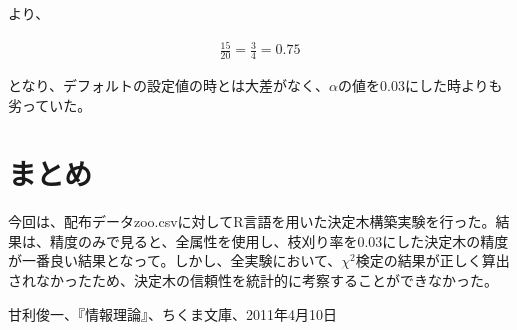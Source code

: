 \documentclass[dvipdfmx]{jsarticle}
\begin{document}
より、
\begin{center}
  \begin{align*}
    \frac{15}{20} = \frac{3}{4} = 0.75
  \end{align*}
\end{center}
となり、デフォルトの設定値の時とは大差がなく、$\alpha$の値を0.03にした時よりも劣っていた。
\section{まとめ}
今回は、配布データzoo.csvに対してR言語を用いた決定木構築実験を行った。結果は、精度のみで見ると、全属性を使用し、枝刈り率を0.03にした決定木の精度が一番良い結果となって。しかし、全実験において、$χ^{2}検定$の結果が正しく算出されなかったため、決定木の信頼性を統計的に考察することができなかった。
\begin{thebibliography}{99}
   甘利俊一、『情報理論』、ちくま文庫、2011年4月10日
\end{thebibliography}
\end{document}

